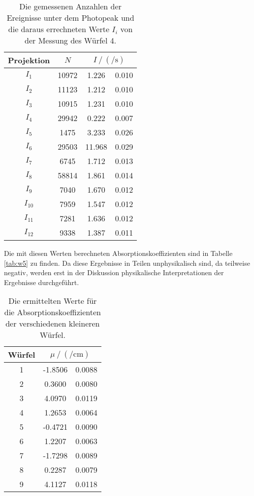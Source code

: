     \begin{table}[H]
    \centering
    \caption{Die gemessenen Anzahlen der Ereignisse unter dem Photopeak und die daraus errechneten Werte $I_i$ von der Messung des Würfel 4.}
    \label{tab:w4}
    \begin{tabular}{c S[table-format=4.0] S[table-format=2.3] @{${}\pm{}$} S[table-format=1.3] }
      \toprule
      {Projektion} &  &  \\
      \midrule
      $I_1 $   &  10972 & 1.226 & 0.010 \\
      $I_2 $   &  11123 & 1.212 & 0.010\\
      $I_3 $   &  10915 & 1.231 & 0.010\\
      $I_4 $   &  29942 & 0.222 & 0.007\\
      $I_5 $   &   1475 & 3.233 & 0.026\\
      $I_6 $   &  29503 & 11.968& 0.029 \\
      $I_7 $   &   6745 & 1.712 & 0.013\\
      $I_8 $   &  58814 & 1.861 & 0.014\\
      $I_9 $   &   7040 & 1.670 & 0.012\\
      $I_{10}$ &   7959 & 1.547 & 0.012\\
      $I_{11}$ &   7281 & 1.636 & 0.012\\
      $I_{12}$ &   9338 & 1.387 & 0.011\\
      \bottomrule
    \end{tabular}
  \end{table}
  \noindent
  Die mit diesen Werten berechneten Absorptionskoeffizienten sind in Tabelle \ref{tab:w5} zu finden.
  Da diese Ergebnisse in Teilen unphysikalisch sind, da teilweise negativ, werden erst in der Diskussion physikalische Interpretationen der Ergebnisse durchgeführt.

  \begin{table}[H]
    \centering
    \caption{Die ermittelten Werte für die Absorptionskoeffizienten der verschiedenen kleineren Würfel.}
    \label{tab:mu4}
    \begin{tabular}{c S[table-format=3.4] @{${}\pm{}$} S[table-format=1.4] }
      \toprule
      {Würfel} &   \\
       & -1.8506& 0.0088 \\
      2 & 0.3600 & 0.0080 \\
      3 & 4.0970 & 0.0119 \\
      4 & 1.2653 & 0.0064 \\
      5 & -0.4721& 0.0090 \\
      6 & 1.2207 & 0.0063 \\
      7 & -1.7298& 0.0089 \\
      8 & 0.2287 & 0.0079 \\
      9 & 4.1127 & 0.0118 \\
      \bottomrule
    \end{tabular}
  \end{table}